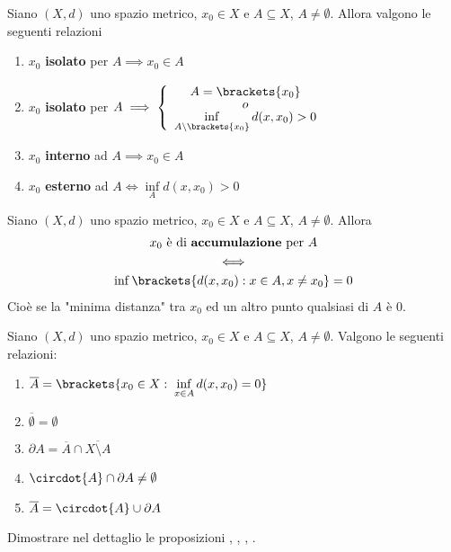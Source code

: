 \begin{proposition}
	\label{prop:relaz_sp_metr_1}
	Siano $(X,d)$ uno spazio metrico, $x_0 \in X$ e $A \subseteq X$, $A \neq \emptyset$. Allora valgono le seguenti relazioni
	\begin{enumerate}
		\item $x_0$ \textbf{isolato} per $A \implies x_0 \in A$
		\item $x_0$ \textbf{isolato} per $A \implies
			\begin{cases}
				\begin{array}{c}
					A = \brackets{x_0}\\[-1ex]
					o\\[-1ex]
					\inf\limits_{A \setminus \brackets{x_0}} d(x,x_0) > 0
				\end{array}
			\end{cases}
			$
		\item $x_0$ \textbf{interno} ad $A \implies x_0 \in A$
		\item $x_0$ \textbf{esterno} ad $A \iff \inf\limits_A d(x,x_0) > 0$
		\end{enumerate}
\end{proposition}
\begin{proposition}
	\label{prop:condiz_punt_accumulaz}
	Siano $(X,d)$ uno spazio metrico, $x_0 \in X$ e $A \subseteq X$, $A \neq \emptyset$. Allora
	\begin{equation*}
		\begin{gathered}
			x_0 \text{ è di \textbf{accumulazione} per } A\\
			\iff\\
			\inf \brackets{d(x,x_0) : x \in A, x \neq x_0} = 0
		\end{gathered}
	\end{equation*}
	Cioè se la "minima distanza" tra $x_0$ ed un altro punto qualsiasi di $A$ è $0$.
\end{proposition}
\begin{proposition}
	\label{prop:relaz_sp_metr_2}
	Siano $(X,d)$ uno spazio metrico, $x_0 \in X$ e $A \subseteq X$, $A \neq \emptyset$. Valgono le seguenti relazioni:
	\begin{enumerate}
		\item $\overline{A} = \brackets{x_0 \in X:\; \inf\limits_{x \in A} d(x, x_0) = 0}$
		\item $\overline{\emptyset} = \emptyset$
		\item $\partial A = \overline{A} \cap \overline{X \setminus A}$
		\item $\circdot{A} \cap \partial A \neq \emptyset$
		\item $\overline{A} = \circdot{A} \cup \partial A$
	\end{enumerate}
\end{proposition}
\begin{exercise}
	Dimostrare nel dettaglio le proposizioni , , , .
\end{exercise}

